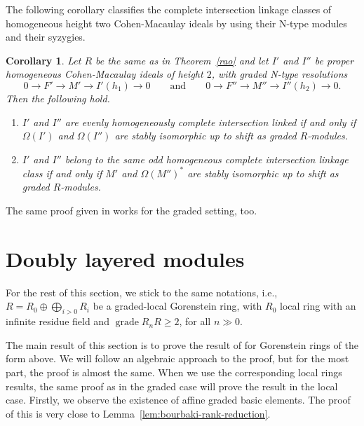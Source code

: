 \documentclass[11pt,letterpaper]{amsart}
\DeclareMathOperator{\gr}{grade}
\theoremstyle{plain}
\newtheorem{cor}[thm]{Corollary}
\theoremstyle{definition}
\theoremstyle{remark}
\begin{document}
The following corollary classifies the complete intersection linkage classes of homogeneous height two Cohen-Macaulay ideals by using their N-type modules and their syzygies.
\begin{cor}\cite[Corollary~2.4, 2.5]{herzog1987maximal}\label{oddCIlinkageclass}
Let \(R\) be the same as in Theorem~\ref{rao} and let \(I'\) and \(I''\) be proper homogeneous Cohen-Macaulay ideals of height \(2\), with graded N-type resolutions
\[
0\longrightarrow F'\longrightarrow M'\longrightarrow I'(h_1)\longrightarrow0
\qquad\text{and}\qquad
0\longrightarrow F''\longrightarrow M''\longrightarrow I''(h_2)\longrightarrow0.
\]
Then the following hold.
\begin{enumerate}
\item[(a)] \(I'\) and \(I''\) are evenly homogeneously complete intersection linked if and only if $
\Omega(I')$ and $\Omega(I'')$ 
are stably isomorphic up to shift as graded \(R\)-modules.%

\item[(b)] \(I'\) and \(I''\) belong to the same odd homogeneous complete intersection linkage class if and only if $M'$ and $\Omega(M'')^*$ are stably isomorphic up to shift as graded \(R\)-modules.
\end{enumerate}
\end{cor}

The same proof given in \cite{herzog1987maximal} works for the graded setting, too.

\section{Doubly layered modules}

For the rest of this section, we stick to the same notations, i.e., $R=R_0\oplus\bigoplus_{i>0} R_i$ be a graded-local Gorenstein ring, with $R_0$ local ring with an infinite residue field and $\gr R_nR\ge 2$, for all $n\gg 0$.

The main result of this section is to prove the result of \cite[Corollary~5.3]{CasanellasDrozdHartshorne+2005+149+171} for Gorenstein rings of the form above. We will follow an algebraic approach to the proof, but for the most part, the proof is almost the same. When we use the corresponding local rings results, the same proof as in the graded case will prove the result in the local case. Firstly, we observe the existence of affine graded basic elements. The proof of this is very close to Lemma~\ref{lem:bourbaki-rank-reduction}.
\end{document}
